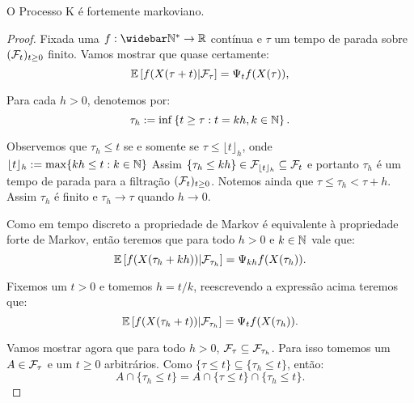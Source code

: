 \begin{teorema}
  \label{teo:markov-forte}
  O Processo K é fortemente markoviano.
\end{teorema}
\begin{proof}
  Fixada uma $f: \Nzb \to \R$ contínua e $\tau$ um tempo de parada
  sobre $({\mathcal{F}}_t)_{t \geq 0}$ \qc finito. Vamos mostrar que quase
  certamente:
  \begin{equation}
    \label{eq:markov-forte}
    {\mathbb{E}} \left[ f(X(\tau + t) \middle| {\mathcal{F}}_\tau \right]
    = \Psi_t f (X(\tau)),
  \end{equation}

  Para cada $h > 0$, denotemos por: 
  \begin{displaymath}
    \tau_h := \inf\left\{
      t \geq \tau: t = k h, k \in {\mathbb{N}}
    \right\}.
  \end{displaymath}

  Observemos que $\tau_h \leq t$ se e somente se $\tau \leq \lfloor t
  \rfloor_h$, onde $\lfloor t \rfloor_h := \max\{k h \leq t: k \in
  {\mathbb{N}}\}$ Assim $\{\tau_h \leq k h\} \in {\mathcal{F}}_{\lfloor t \rfloor_h}
  \subseteq {\mathcal{F}}_t$ e portanto $\tau_h$ é um tempo de parada para a
  filtração $({\mathcal{F}}_{t})_{t \geq 0}$. Notemos ainda que $\tau \leq \tau_h
  < \tau + h$. Assim $\tau_h$ é \qc finito e $\tau_h \to \tau$ \qc
  quando $h \to 0$.

  Como em tempo discreto a propriedade de Markov é equivalente à
  propriedade forte de Markov, então teremos que para todo $h > 0$ e
  $k \in {\mathbb{N}}$ vale que:
 \begin{displaymath}
    {\mathbb{E}} \left[ f(X(\tau_h + k h)) \middle| {\mathcal{F}}_{\tau_h} \right]
    = \Psi_{k h} f (X(\tau_h)).
  \end{displaymath}
  
  Fixemos um $t > 0$ e tomemos $h = t/k$, reescrevendo a expressão acima
  teremos que:
  \begin{equation}
    \label{eq:markov-forte-esp-cond}
    {\mathbb{E}} \left[ f(X(\tau_h + t)) \middle| {\mathcal{F}}_{\tau_h} \right]
    = \Psi_t f (X(\tau_h)).
  \end{equation}
  

  Vamos mostrar agora que para todo $h > 0$, ${\mathcal{F}}_{\tau} \subseteq
  {\mathcal{F}}_{\tau_h}$. Para isso tomemos um $A \in {\mathcal{F}}_\tau$ e um $t \geq 0$
  arbitrários. Como $\{\tau \leq t\} \subseteq \{\tau_h \leq t\}$,
  então:
  \begin{displaymath}
    A \cap \{ \tau_h \leq t \} =
    A \cap \{ \tau \leq t \} \cap \{ \tau_h \leq t \}.
  \end{displaymath}
  

\end{proof}
